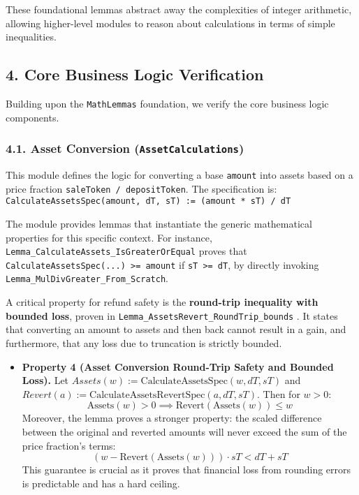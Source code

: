 \documentclass[
  english,
  onecolumn]{article}
\providecommand{\tightlist}{%
  \setlength{\itemsep}{0pt}\setlength{\parskip}{0pt}}
\begin{document}
These foundational lemmas abstract away the complexities of integer
arithmetic, allowing higher-level modules to reason about calculations
in terms of simple inequalities.

\subsection{4. Core Business Logic
Verification}\label{core-business-logic-verification}

Building upon the \texttt{MathLemmas} foundation, we verify the core
business logic components.

\subsubsection{\texorpdfstring{4.1. Asset Conversion
(\texttt{AssetCalculations})}{4.1. Asset Conversion (AssetCalculations)}}\label{asset-conversion-assetcalculations}

This module defines the logic for converting a base \texttt{amount} into
assets based on a price fraction \texttt{saleToken\ /\ depositToken}.
The specification is:
\texttt{CalculateAssetsSpec(amount,\ dT,\ sT)\ :=\ (amount\ *\ sT)\ /\ dT}

The module provides lemmas that instantiate the generic mathematical
properties for this specific context. For instance,
\texttt{Lemma\_CalculateAssets\_IsGreaterOrEqual} proves that
\texttt{CalculateAssetsSpec(...)\ \textgreater{}=\ amount} if
\texttt{sT\ \textgreater{}=\ dT}, by directly invoking
\texttt{Lemma\_MulDivGreater\_From\_Scratch}.

A critical property for refund safety is the \textbf{round-trip
inequality with bounded loss}, proven in
\texttt{Lemma\_AssetsRevert\_RoundTrip\_bounds}
. It states that converting
an amount to assets and then back cannot result in a gain, and
furthermore, that any loss due to truncation is strictly bounded.

\begin{itemize}
\tightlist
\item
  \textbf{Property 4 (Asset Conversion Round-Trip Safety and Bounded
  Loss).} Let \(Assets(w) := \text{CalculateAssetsSpec}(w, dT, sT)\) and
  \(Revert(a) := \text{CalculateAssetsRevertSpec}(a, dT, sT)\). Then for
  \(w > 0\):
  \[ \text{Assets}(w) > 0 \implies \text{Revert}(\text{Assets}(w)) \le w \]
  Moreover, the lemma proves a stronger property: the scaled difference
  between the original and reverted amounts will never exceed the sum of
  the price fraction's terms:
  \[ (w - \text{Revert}(\text{Assets}(w))) \cdot sT < dT + sT \] This
  guarantee is crucial as it proves that financial loss from rounding
  errors is predictable and has a hard ceiling.
\end{itemize}
\end{document}
